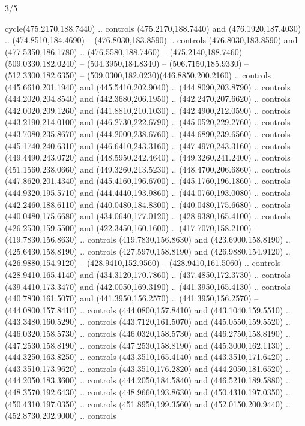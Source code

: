 \begin{flagdescription}{3/5}
\begin{scope}[shift={(0.5\flaglength,0.5\flagwidth)},scale=\flagwidth/510]
\begin{scope}[y=0.80pt, x=0.80pt, yscale=-1.06, xscale=1.06,yshift=-240pt,xshift=-400pt]
\begin{scope}[cm={{0.83333,0.0,0.0,0.83333,(154.64672,48.64761)}}]
\begin{scope}[cm={{0.93334,0.0,0.0,0.93334,(-4.86471,22.64035)}}]
\begin{scope}[line width=0.489\lw]
\begin{scope}[draw=black,fill=cd67c59]
  cycle(475.2170,188.7440) .. controls (475.2170,188.7440) and
  (476.1920,187.4030) .. (474.8510,184.4690) -- (476.8030,183.8590) .. controls
  (476.8030,183.8590) and (477.5350,186.1780) .. (476.5580,188.7460) --
  (475.2140,188.7460)(509.0330,182.0240) -- (504.3950,184.8340) --
  (506.7150,185.9330) -- (512.3300,182.6350) --
  (509.0300,182.0230)(446.8850,200.2160) .. controls (445.6610,201.1940) and
  (445.5410,202.9040) .. (444.8090,203.8790) .. controls (444.2020,204.8540) and
  (442.3680,206.1950) .. (442.2470,207.6620) .. controls (442.0020,209.1260) and
  (441.8810,210.1030) .. (442.4900,212.0590) .. controls (443.2190,214.0100) and
  (446.2730,222.6790) .. (445.0520,229.2760) .. controls (443.7080,235.8670) and
  (444.2000,238.6760) .. (444.6890,239.6560) .. controls (445.1740,240.6310) and
  (446.6410,243.3160) .. (447.4970,243.3160) .. controls (449.4490,243.0720) and
  (448.5950,242.4640) .. (449.3260,241.2400) .. controls (451.1560,238.0660) and
  (449.3260,213.5230) .. (448.4700,206.6860) .. controls (447.8620,201.4340) and
  (445.4160,196.6700) .. (445.1760,196.1860) .. controls (444.9320,195.5710) and
  (444.4440,193.9860) .. (444.0760,193.0080) .. controls (442.2460,188.6110) and
  (440.0480,184.8300) .. (440.0480,175.6680) .. controls (440.0480,175.6680) and
  (434.0640,177.0120) .. (428.9380,165.4100) .. controls (426.2530,159.5500) and
  (422.3450,160.1600) .. (417.7070,158.2100) -- (419.7830,156.8630) .. controls
  (419.7830,156.8630) and (423.6900,158.8190) .. (425.6430,158.8190) .. controls
  (427.5970,158.8190) and (426.9880,154.9120) .. (426.9880,154.9120) --
  (428.9410,152.9560) -- (428.9410,161.5060) .. controls (428.9410,165.4140) and
  (434.3120,170.7860) .. (437.4850,172.3730) .. controls (439.4410,173.3470) and
  (442.0050,169.3190) .. (441.3950,165.4130) .. controls (440.7830,161.5070) and
  (441.3950,156.2570) .. (441.3950,156.2570) -- (444.0800,157.8410) .. controls
  (444.0800,157.8410) and (443.1040,159.5510) .. (443.3480,160.5290) .. controls
  (443.7120,161.5070) and (445.0550,159.5520) .. (446.0320,158.5730) .. controls
  (446.0320,158.5730) and (446.2750,158.8190) .. (447.2530,158.8190) .. controls
  (447.2530,158.8190) and (445.3000,162.1130) .. (444.3250,163.8250) .. controls
  (443.3510,165.4140) and (443.3510,171.6420) .. (443.3510,173.9620) .. controls
  (443.3510,176.2820) and (444.2050,181.6520) .. (444.2050,183.3600) .. controls
  (444.2050,184.5840) and (446.5210,189.5880) .. (448.3570,192.6430) .. controls
  (448.9660,193.8630) and (450.4310,197.0350) .. (450.4310,197.0350) .. controls
  (451.8950,199.3560) and (452.0150,200.9440) .. (452.8730,202.9000) .. controls

\end{scope}
\end{scope}
\end{scope}
\end{scope}
\end{scope}
\end{scope}
\end{flagdescription}
